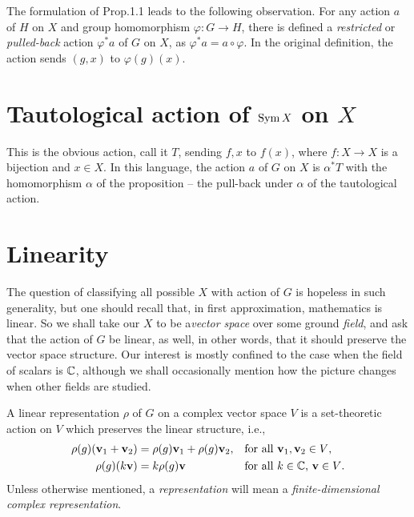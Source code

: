 The formulation of Prop.\@ 1.1 leads to the following observation. For any
action \(a\) of \(H\) on \(X\) and group homomorphism
\(\varphi\colon G\to H\), there is defined a \emph{restricted} or
\emph{pulled-back} action \(\varphi^*a\) of \(G\) on \(X\), as
\(\varphi^*a=a\circ\varphi\). In the original definition, the action sends
\((g,x)\) to \(\varphi(g)(x)\).

\section{Tautological action of \(\operatorname{Sym} X\) on \(X\)}
This is the obvious action, call it \(T\), sending \(f,x\) to \(f(x)\),
where \(f\colon X\to X\) is a bijection and \(x\in X\). In this language,
the action \(a\) of \(G\) on \(X\) is \(\alpha^*T\) with the homomorphism
\(\alpha\) of the proposition -- the pull-back under \(\alpha\) of the
tautological action.

\section{Linearity}
The question of classifying all possible \(X\) with action of \(G\) is
hopeless in such generality, but one should recall that, in first
approximation, mathematics is linear. So we shall take our \(X\) to be
a\emph{vector space} over some ground \emph{field}, and ask that the action
of \(G\) be linear, as well, in other words, that it should preserve the
vector space structure. Our interest is mostly confined to the case when
the field of scalars is \(\mathbb{C}\), although we shall occasionally mention
how the picture changes when other fields are studied.

\begin{definition}
  A linear representation \(\rho\) of \(G\) on a complex vector space \(V\)
  is a set-theoretic action on \(V\) which preserves the linear structure,
  i.e.,
  \begin{align*}
    \rho(g)(\mathbf{v}_1+\mathbf{v}_2)&=\rho(g)\mathbf{v}_1+\rho(g)\mathbf{v}_2,&&\text{for all
                                                          \(\mathbf{v}_1,\mathbf{v}_2\in
                                                          V\)},\\
    \rho(g)(k\mathbf{v})&=k\rho(g)\mathbf{v}&&\text{for all \(k\in\mathbb{C}\), \(\mathbf{v}\in V\).}
  \end{align*}
  Unless otherwise mentioned, a \emph{representation} will mean a
  \emph{finite-dimensional complex representation}.
\end{definition}

